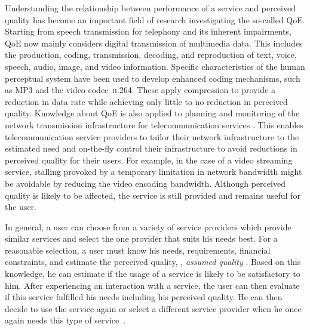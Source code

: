 Understanding the relationship between performance of a service and perceived quality has become an important field of research investigating the so-called \ac{QoE}.
Starting from speech transmission for telephony \citep[][]{ieee_audio_and_electroacoustics_group_ieee_1969} and its inherent impairments, \ac{QoE} now mainly considers digital transmission of multimedia data. %
This includes the production, coding, transmission, decoding, and reproduction of text, voice, speech, audio, image, and video information.
Specific characteristics of the human perceptual system have been used to develop enhanced coding mechanisms, such as \ac{MP3} and the video codec~\textsc{\lowercase{H.264}}.
These apply compression to provide a reduction in data rate while achieving only little to no reduction in perceived quality.
Knowledge about \ac{QoE} is also applied to planning and monitoring of the network transmission infrastructure for telecommunication services \citep[][]{schatz_qoe-based_2014}.
This enables telecommunication service providers to tailor their network infrastructure to the estimated need and on-the-fly control their infrastructure to avoid reductions in perceived quality for their users.
For example, in the case of a video streaming service, stalling provoked by a temporary limitation in network bandwidth might be avoidable by reducing the video encoding bandwidth.
Although perceived quality is likely to be affected, the service is still provided and remains useful for the user.

In general, a user can choose from a variety of service providers which provide similar services and select the one provider that suits his needs best.
For a reasonable selection, a user must know his needs, requirements, financial constraints, and estimate the perceived quality, \ie, \emph{assumed quality} \citep[][p.\,13]{raake_quality_2014}.
Based on this knowledge, he can estimate if the usage of a service is likely to be satisfactory to  him.
After experiencing an interaction with a service, the user can then evaluate if this service fulfilled his needs including his perceived quality.
He can then decide to use the service again or select a different service provider when he once again needs this type of service~\citep[][]{geerts_linking_2010}.


